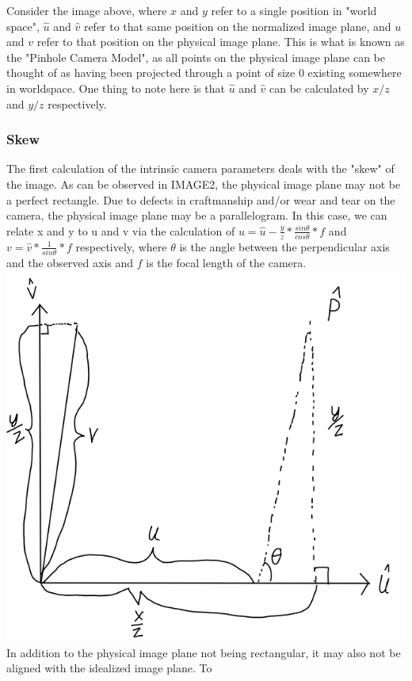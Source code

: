 Consider the image above, where $x$ and $y$ refer to a single position in "world space", $\hat{u}$ and $\hat{v}$ refer to that same position on the normalized image plane, and $u$ and $v$ refer to that position on the physical image plane.  This is what is known as the "Pinhole Camera Model", as all points on the physical image plane can be thought of as having been projected through a point of size 0 existing somewhere in worldspace.  One thing to note here is that $\hat{u}$ and $\hat{v}$ can be calculated by $x/z$ and $y/z$ respectively.
\subsubsection{Skew}
The first calculation of the intrinsic camera parameters deals with the "skew" of the image.  As can be observed in IMAGE2, the physical image plane may not be a perfect rectangle.  Due to defects in craftmanship and/or wear and tear on the camera, the physical image plane may be a parallelogram.  In this case, we can relate x and y to u and v via the calculation of $u=\hat{u}-\frac{y}{z} * \frac{sin  \theta }{ cos \theta} * f$ and $v=\hat{v}*\frac{1}{sin \theta} * f$ respectively, where $\theta$ is the angle between the perpendicular axis and the observed axis and $f$ is the focal length of the camera.
\includegraphics[width=\textwidth]{Image2}
In addition to the physical image plane not being rectangular, it may also not be aligned with the idealized image plane.  To
